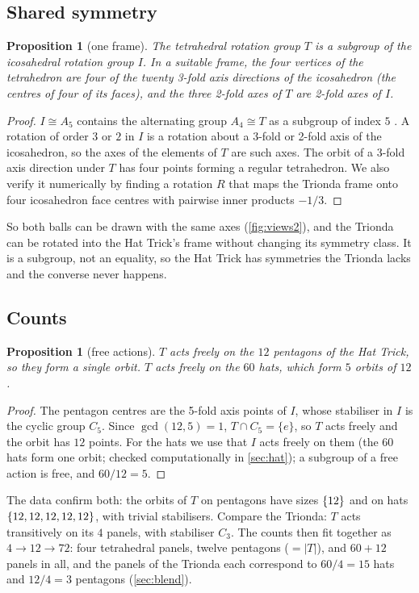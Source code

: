 \documentclass[11pt]{article}
\newtheorem{proposition}[theorem]{Proposition}
\theoremstyle{definition}
\theoremstyle{remark}
\begin{document}
\subsection{Shared symmetry}
\begin{proposition}[one frame]\label{prop:oneframe}
The tetrahedral rotation group $T$ is a subgroup of the icosahedral rotation group $I$. In a suitable frame, the four vertices of the tetrahedron are four of the twenty 3-fold axis directions of the icosahedron
(the centres of four of its faces), and the three 2-fold axes of $T$ are 2-fold axes of $I$.
\end{proposition}
\begin{proof}
$I\cong A_5$ contains the alternating group $A_4\cong T$ as a subgroup of index $5$ \citep{coxeter_regular}. A rotation of order $3$ or $2$ in $I$ is a rotation about a 3-fold or 2-fold axis of the icosahedron, so the
axes of the elements of $T$ are such axes. The orbit of a 3-fold axis direction under $T$ has four points forming a regular tetrahedron. We also verify it numerically by finding a rotation $R$ that maps the Trionda frame onto
four icosahedron face centres with pairwise inner products $-1/3$.
\end{proof}
So both balls can be drawn with the same axes (\cref{fig:views2}), and the Trionda can be rotated into the Hat Trick's frame without changing its symmetry class. It is a subgroup, not an equality, so the Hat Trick has symmetries the Trionda lacks and the converse never happens.

\subsection{Counts}
\begin{proposition}[free actions]\label{prop:free}
$T$ acts freely on the $12$ pentagons of the Hat Trick, so they form a single orbit. $T$ acts freely on the $60$ hats, which form $5$ orbits of $12$.
\end{proposition}
\begin{proof}
The pentagon centres are the 5-fold axis points of $I$, whose stabiliser in $I$ is the cyclic group $C_5$. Since $\gcd(12,5)=1$, $T\cap C_5=\{e\}$, so $T$ acts freely and the orbit has $12$ points. For the hats we use that $I$ acts freely on them (the 60 hats form one orbit; checked computationally in \cref{sec:hat}); a subgroup of a free action is free, and $60/12=5$.
\end{proof}
The data confirm both: the orbits of $T$ on pentagons have sizes $\{12\}$ and on hats $\{12,12,12,12,12\}$, with trivial stabilisers. Compare the Trionda: $T$ acts transitively on its $4$ panels, with stabiliser $C_3$.
The counts then fit together as $4\to12\to72$: four tetrahedral panels, twelve pentagons ($=|T|$), and $60+12$ panels in all, and the panels of the Trionda each correspond to $60/4=15$ hats and $12/4=3$ pentagons (\cref{sec:blend}).
\end{document}
